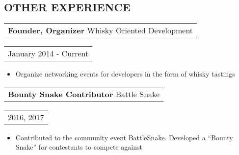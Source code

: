 \documentclass{resume}
\begin{document}
\begin{resume}
\section{OTHER EXPERIENCE}
    \vspace{+0.1in}
    \begin{tabular}[t]{@{}l}
        {\bf Founder, Organizer   } Whisky Oriented Development
    \end{tabular}\vspace{+0.05in}
    \hfill
    \begin{tabular}[t]{l@{}}
        January 2014 - Current
    \end{tabular}
    \begin{itemize} \itemsep -2pt
    \item Organize networking events for developers in the form of whisky tastings
    \end{itemize}

    \begin{tabular}[t]{@{}l}
        {\bf Bounty Snake Contributor   } Battle Snake
    \end{tabular}\vspace{+0.05in}
    \hfill
    \begin{tabular}[t]{l@{}}
        2016, 2017
    \end{tabular}
    \begin{itemize} \itemsep -2pt
    \item Contributed to the community event BattleSnake. Developed a “Bounty Snake” for contestants to compete against
    \end{itemize}

\end{resume}
\end{document}
